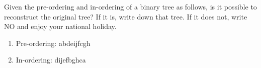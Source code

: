 \documentclass[10.5pt]{article}
\begin{document}
	
	
	
	Given the pre-ordering and in-ordering of a binary tree as follows, is it possible to reconstruct the original tree? If it is, write down that tree. If it does not, write NO and enjoy your national holiday.
	
	\begin{enumerate}[(1)]
		\item Pre-ordering: abdeijfcgh
		\item In-ordering: dijefbghca
	\end{enumerate}
	
\end{document}
